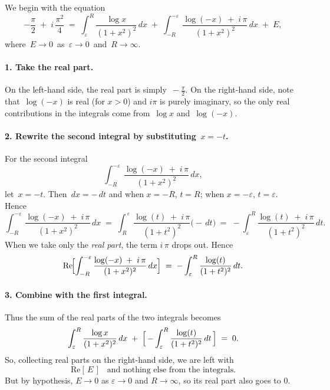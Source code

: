 \documentclass[12pt]{article}
\theoremstyle{definition} %
\theoremstyle{plain} %
\begin{document}
We begin with the equation
\[
-\frac{\pi}{2} \;+\; i\,\frac{\pi^2}{4}
\;=\;
\int_{\varepsilon}^R
\frac{\log x}{(1 + x^2)^2}\,dx
\;+\;
\int_{-R}^{-\varepsilon}
\frac{\log(-x) \;+\; i\,\pi}{(1 + x^2)^2}\,dx
\;+\; E,
\]
where \(\,E \to 0\,\) as \(\,\varepsilon \to 0\,\) and \(\,R \to \infty.\)

\paragraph{1. Take the real part.}

On the left-hand side, the real part is simply \(\,-\tfrac{\pi}{2}\).  
On the right-hand side, note that
\(\,\log(-x)\) is real (for \(x>0\)) and \(i\pi\) is purely imaginary, so the only real contributions in the integrals come from \(\,\log x\) and \(\,\log(-x)\).

\paragraph{2. Rewrite the second integral by substituting \(\,x = -t\).}

For the second integral
\[
\int_{-R}^{-\varepsilon} 
\frac{\log(-x) \;+\; i\,\pi}{(1 + x^2)^2}\,dx,
\]
let \(\,x = -t\).  Then \(\,dx = -\,dt\) and when \(x=-R\), \(t=R\); when \(x=-\varepsilon\), \(t=\varepsilon\). Hence
\[
\int_{-R}^{-\varepsilon} 
\frac{\log(-x) \;+\; i\,\pi}{(1 + x^2)^2}\,dx
\;=\;
\int_{\,R}^{\,\varepsilon} 
\frac{\log(t) \;+\; i\,\pi}{(1 + t^2)^2} 
\bigl(-\,dt\bigr)
\;=\;
-\int_{\varepsilon}^{R} 
\frac{\log(t) \;+\; i\,\pi}{(1 + t^2)^2}\,dt.
\]
When we take only the \emph{real part}, the term \(i\,\pi\) drops out.  Hence
\[
\mathrm{Re}\!\Bigl[
\int_{-R}^{-\varepsilon} 
\frac{\log(-x) \;+\; i\,\pi}{(1 + x^2)^2}\,dx
\Bigr]
\;=\;
-\int_{\varepsilon}^{R} 
\frac{\log(t)}{(1 + t^2)^2}\,dt.
\]

\paragraph{3. Combine with the first integral.}

Thus the sum of the real parts of the two integrals becomes
\[
\int_{\varepsilon}^{R} \frac{\log x}{(1 + x^2)^2}\,dx
\;+\;
\Bigl[\,-\int_{\varepsilon}^{R} \frac{\log(t)}{(1 + t^2)^2}\,dt\,\Bigr]
\;=\;
0.
\]
So, collecting real parts on the right-hand side, we are left with 
\[
\mathrm{Re}[\,E\,] 
\;\;\;\text{and nothing else from the integrals.}
\]
But by hypothesis, \(E \to 0\) as \(\varepsilon \to 0\) and \(R \to \infty\), so its real part also goes to \(0\).  
\end{document}
